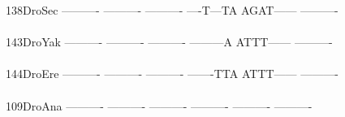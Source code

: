 \documentclass[11pt,twoside,reqno,a4paper]{article}
\begin{document}
{138\hspace*{2\charwidth}DroSec	----------	----------	----------	----T---TA	AGAT------	----------	\\
\hspace*{5\charwidth}\hspace*{7\charwidth}\hspace*{1\charwidth}\hspace*{1\charwidth}\hspace*{1\charwidth}\hspace*{1\charwidth}\hspace*{1\charwidth}\hspace*{1\charwidth}\\
143\hspace*{2\charwidth}DroYak	----------	----------	----------	---------A	ATTT------	----------	\\
\hspace*{5\charwidth}\hspace*{7\charwidth}\hspace*{1\charwidth}\hspace*{1\charwidth}\hspace*{1\charwidth}\hspace*{1\charwidth}\hspace*{1\charwidth}\hspace*{1\charwidth}\\
144\hspace*{2\charwidth}DroEre	----------	----------	----------	-------TTA	ATTT------	----------	\\
\hspace*{5\charwidth}\hspace*{7\charwidth}\hspace*{1\charwidth}\hspace*{1\charwidth}\hspace*{1\charwidth}\hspace*{1\charwidth}\hspace*{1\charwidth}\hspace*{1\charwidth}\\
109\hspace*{2\charwidth}DroAna	----------	----------	----------	----------	----------	----------	\\
\hspace*{5\charwidth}\hspace*{7\charwidth}\hspace*{1\charwidth}\hspace*{1\charwidth}\hspace*{1\charwidth}\hspace*{1\charwidth}\hspace*{1\charwidth}\hspace*{1\charwidth}\\
}
\end{document}
